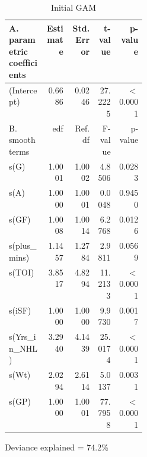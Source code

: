 \documentclass[10pt]{article}
\begin{document}
{{{{\begin{table}[tph]
\centering
\caption{Initial GAM} 
\label{tab.gam}
\begin{threeparttable}
\begin{tabular}[t]{L{0.27\linewidth}rrrr} 
   \toprule
A. parametric coefficients & Estimate & Std. Error & t-value & p-value \\ 
   \midrule
  (Intercept) & 0.6686 & 0.0246 & 27.2225 & $<$ 0.0001 \\ 
   \midrule
B. smooth terms & edf & Ref.df & F-value & p-value \\ 
   \midrule
  s(G) & 1.0001 & 1.0002 & 4.8506 & 0.0283 \\ 
  s(A) & 1.0000 & 1.0001 & 0.0048 & 0.9450 \\ 
  s(GF) & 1.0008 & 1.0014 & 6.2768 & 0.0126 \\ 
  s(plus\_mins) & 1.1457 & 1.2784 & 2.9811 & 0.0569 \\ 
  s(TOI) & 3.8517 & 4.8294 & 11.2133 & $<$ 0.0001 \\ 
  s(iSF) & 1.0000 & 1.0000 & 9.9730 & 0.0017 \\ 
  s(Yrs\_in\_NHL) & 3.2940 & 4.1439 & 25.0174 & $<$ 0.0001 \\ 
  s(Wt) & 2.0294 & 2.6114 & 5.0137 & 0.0031 \\ 
  s(GP) & 1.0000 & 1.0001 & 77.7958 & $<$ 0.0001 \\ 
   \bottomrule
\end{tabular}
    \begin{tablenotes}
      \item Deviance explained = 74.2\%
    \end{tablenotes}
  \end{threeparttable}    
\end{table}

}}}}
\end{document}
